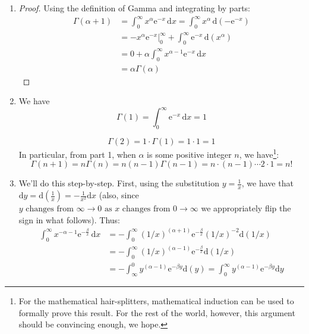 \documentclass[12pt]{article}
\begin{document}
\begin{enumerate}
\item \begin{proof} Using the definition of Gamma and integrating by parts:
          \begin{align*}
		\Gamma(\alpha + 1) &= \int_0^\infty x^{\alpha}\mathrm{e}^{-x}\,\mathrm{d}x =
		\int_0^\infty x^{\alpha}\,\mathrm{d}(-\mathrm{e}^{-x})\\
		& = \left.-x^{\alpha}\mathrm{e}^{-x}\right|_0^\infty	+ \int_0^\infty \mathrm{e}^{-x}\,\mathrm{d}(x^{\alpha})\\
		& = 0 + \alpha\int_0^\infty x^{\alpha - 1}\mathrm{e}^{-x}\,\mathrm{d}x\\
		& = \alpha \Gamma(\alpha)
	  \end{align*}
          \end{proof}
\item We have $$
          \Gamma(1) = \int_0^\infty \mathrm{e}^{-x}\,\mathrm{d}x = 1
           $$
           
           $$
           \Gamma(2) = 1 \cdot \Gamma(1) = 1 \cdot 1 = 1
           $$
           In particular, from part 1, when $\alpha$ is some positive integer $n$,  we have\footnote{For the mathematical hair-splitters, mathematical induction can be used to formally prove this result. For the rest of the world, however, this argument should be convincing enough, we hope. }:
           $$
           \Gamma(n+1) = n \Gamma(n) = n (n -1) \Gamma(n - 1) =  n \cdot (n - 1) \cdots 2 \cdot 1 = n!
           $$

\item We'll do this step-by-step. First, using the substitution $y = \frac{1}{x}$, we have that $\mathrm{d}y = \mathrm{d}(\frac{1}{x}) = 
                                -\frac{1}{x^2}\mathrm{d}x$ (also, since $y \text{ changes from } \infty \to 0 \text{ as } x \text{ changes from } 0 \to \infty$ we appropriately flip the sign in what follows). Thus:
                                \begin{align*}
                                \int_0^\infty x^{-\alpha - 1}\mathrm{e}^{-\frac{\beta}{x}}\,\mathrm{d}x &=
                                -\int_0^\infty (1/x)^{(\alpha + 1)} \mathrm{e}^{-\frac{\beta}{x}} (1/x)^{-2}\mathrm{d}(1/x)\\
                                &= -\int_0^\infty (1/x)^{(\alpha - 1)} \mathrm{e}^{-\frac{\beta}{x}} \mathrm{d}(1/x)\\
                                &= -\int_\infty^0 y^{(\alpha - 1)} \mathrm{e}^{-\beta y} \mathrm{d}(y) = \int_0^\infty y^{(\alpha - 1)} \mathrm{e}^{-\beta y} \mathrm{d}y
                                \end{align*}
                                

\end{enumerate}
\end{document}
